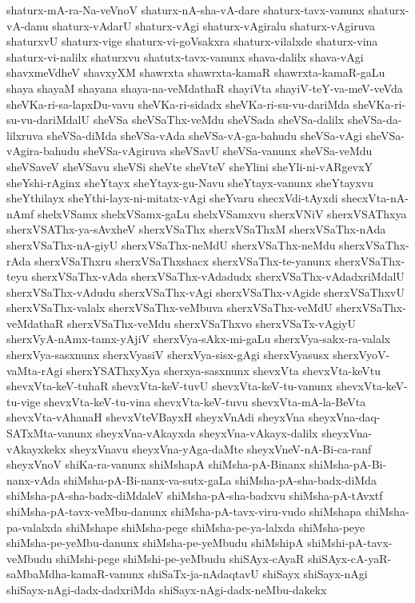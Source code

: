 {shaturx-mA-ra-Na-veVnoV
shaturx-nA-sha-vA-dare
shaturx-tavx-vanunx
shaturx-vA-danu
shaturx-vAdarU
shaturx-vAgi
shaturx-vAgiralu
shaturx-vAgiruva
shaturxvU
shaturx-vige
shaturx-vi-goVsakxra
shaturx-vilalxde
shaturx-vina
shaturx-vi-nalilx
shaturxvu
shatutx-tavx-vanunx
shava-dalilx
shava-vAgi
shavxmeVdheV
shavxyXM
shawrxta
shawrxta-kamaR
shawrxta-kamaR-gaLu
shaya
shayaM
shayana
shaya-na-veMdathaR
shayiVta
shayiV-teY-va-meV-veVda
sheVKa-ri-sa-lapxDu-vavu
sheVKa-ri-sidadx
sheVKa-ri-su-vu-dariMda
sheVKa-ri-su-vu-dariMdalU
sheVSa
sheVSaThx-veMdu
sheVSada
sheVSa-dalilx
sheVSa-da-lilxruva
sheVSa-diMda
sheVSa-vAda
sheVSa-vA-ga-bahudu
sheVSa-vAgi
sheVSa-vAgira-bahudu
sheVSa-vAgiruva
sheVSavU
sheVSa-vanunx
sheVSa-veMdu
sheVSaveV
sheVSavu
sheVSi
sheVte
sheVteV
sheYlini
sheYli-ni-vARgevxY
sheYshi-rAginx
sheYtayx
sheYtayx-gu-Navu
sheYtayx-vanunx
sheYtayxvu
sheYthilayx
sheYthi-layx-ni-mitatx-vAgi
sheYvaru
shecxVdi-tAyxdi
shecxVta-nA-nAmf
shelxVSamx
shelxVSamx-gaLu
shelxVSamxvu
sherxVNiV
sherxVSAThxya
sherxVSAThx-ya-sAvxheV
sherxVSaThx
sherxVSaThxM
sherxVSaThx-nAda
sherxVSaThx-nA-giyU
sherxVSaThx-neMdU
sherxVSaThx-neMdu
sherxVSaThx-rAda
sherxVSaThxru
sherxVSaThxshacx
sherxVSaThx-te-yanunx
sherxVSaThx-teyu
sherxVSaThx-vAda
sherxVSaThx-vAdadudx
sherxVSaThx-vAdadxriMdalU
sherxVSaThx-vAdudu
sherxVSaThx-vAgi
sherxVSaThx-vAgide
sherxVSaThxvU
sherxVSaThx-valalx
sherxVSaThx-veMbuva
sherxVSaThx-veMdU
sherxVSaThx-veMdathaR
sherxVSaThx-veMdu
sherxVSaThxvo
sherxVSaTx-vAgiyU
sherxVyA-nAmx-tamx-yAjiV
sherxVya-sAkx-mi-gaLu
sherxVya-sakx-ra-valalx
sherxVya-sasxnunx
sherxVyasiV
sherxVya-sisx-gAgi
sherxVyasusx
sherxVyoV-vaMta-rAgi
sherxYSAThxyXya
sherxya-sasxnunx
shevxVta
shevxVta-keVtu
shevxVta-keV-tuhaR
shevxVta-keV-tuvU
shevxVta-keV-tu-vanunx
shevxVta-keV-tu-vige
shevxVta-keV-tu-vina
shevxVta-keV-tuvu
shevxVta-mA-la-BeVta
shevxVta-vAhanaH
shevxVteVBayxH
sheyxVnAdi
sheyxVna
sheyxVna-daq-SATxMta-vanunx
sheyxVna-vAkayxda
sheyxVna-vAkayx-dalilx
sheyxVna-vAkayxkekx
sheyxVnavu
sheyxVna-yAga-daMte
sheyxVneV-nA-Bi-ca-ranf
sheyxVnoV
shiKa-ra-vanunx
shiMshapA
shiMsha-pA-Binanx
shiMsha-pA-Bi-nanx-vAda
shiMsha-pA-Bi-nanx-va-sutx-gaLa
shiMsha-pA-sha-badx-diMda
shiMsha-pA-sha-badx-diMdaleV
shiMsha-pA-sha-badxvu
shiMsha-pA-tAvxtf
shiMsha-pA-tavx-veMbu-danunx
shiMsha-pA-tavx-viru-vudo
shiMshapa
shiMsha-pa-valalxda
shiMshape
shiMsha-pege
shiMsha-pe-ya-lalxda
shiMsha-peye
shiMsha-pe-yeMbu-danunx
shiMsha-pe-yeMbudu
shiMshipA
shiMshi-pA-tavx-veMbudu
shiMshi-pege
shiMshi-pe-yeMbudu
shiSAyx-cAyaR
shiSAyx-cA-yaR-saMbaMdha-kamaR-vanunx
shiSaTx-ja-nAdaqtavU
shiSayx
shiSayx-nAgi
shiSayx-nAgi-dadx-dadxriMda
shiSayx-nAgi-dadx-neMbu-dakekx
}
